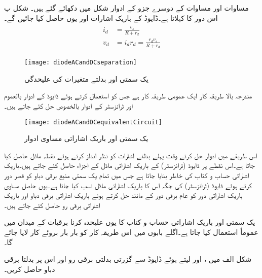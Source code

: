 مساوات   اور مساوات   کے دوسرے جزو کے ادوار شکل    میں دکھائے گئے ہیں۔
شکل  ب اس دور کا  کہلاتا ہے۔ڈایوڈ کے باریک اشارات  اور  یوں حاصل کیا جائیں گے۔
\begin{gather}
\begin{aligned}
i_d&=\frac{v_s}{R+r_d}\\
v_d&=i_d r_d=\frac{r_d v_s}{R+r_d}
\end{aligned}
\end{gather}
%
\begin{figure}
\centering
\texttt{[image: diodeACandDCseparation]}
\caption{یک سمتی اور بدلتے متغیرات کی علیحدگی}
\label{شکل_یک_سمتی_بدلتے_متغیرات_کی_علیحدگی}
\end{figure}
مندرجہ بالا طریقہ کار ایک عمومی طریقہ کار ہے جس کو استعمال کرتے ہوئے ڈایوڈ کے ادوار بالعموم اور ٹرانزسٹر کے ادوار بالخصوص حل کئے جاتے ہیں۔
\begin{figure}
\centering
\texttt{[image: diodeACandDCequivalentCircuit]}
\caption{یک سمتی اور باریک اشاراتی مساوی ادوار}
\label{شکل_یک_سمتی_اور_باریک_اشاراتی_مساوی_ادوار}
\end{figure}
اس طریقے میں ادوار حل کرتے وقت پہلے بدلتے اشارات کو نظر انداز کرتے ہوئے نقطہ مائل حاصل کیا جاتا ہے۔اس نقطے پر ڈایوڈ (ٹرانزسٹر) کے باریک اشاراتی ماڈل کے اجزاء حاصل کئے جاتے ہیں۔باریک اشاراتی حساب و کتاب کی خاطر  بنایا جاتا ہے جس میں تمام یک سمتی منبع برقی دباو کو قصر دور کرتے ہوئے ڈایوڈ (ٹرانزسٹر)  کی جگہ اس کا باریک اشاراتی ماڈل نسب کیا جاتا ہے۔یوں حاصل مساوی باریک اشاراتی دور کو عام برقی دور کے مانند حل کرتے ہوئے باریک اشاراتی برقی دباو اور باریک اشاراتی برقی رو حاصل کئے جاتے ہیں۔

یک سمتی اور باریک اشاراتی حساب و کتاب کا یوں علیحدہ کرنا برقیات کے میدان میں عموماً استعمال کیا جاتا ہے۔اگلے بابوں میں اس طریقہ کار کو بار بار بروئے کار لایا جائے گا۔

شکل  الف میں  ،   اور  لیتے ہوئے ڈایوڈ سے گزرتی بدلتی برقی رو    اور اس پر بدلتا برقی دباو  حاصل کریں۔

